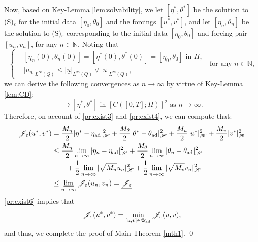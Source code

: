 \documentclass{sinst}
\numberwithin{equation}{section}
\theoremstyle{plain}
\theoremstyle{definition}
\def\N{\mathbb{N}}
\def\sH{\mathscr{H}}
\def\sJ{\mathscr{J}}
\def\sU{\mathscr{U}}
\def\ad{{\rm ad}}
\begin{document}
Now, based on Key-Lemma \ref{lem:solvability}, we let $[\eta^*, \theta^*]$ be the solution to (S)$_\varepsilon$ for the initial data $[\eta_0, \theta_0]$ and the forcings $[u^*, v^*]$, and let $[\eta_n, \theta_n]$ be the solution to (S)$_\varepsilon$ corresponding to the initial data $[\eta_0, \theta_0]$ and forcing pair $[u_n, v_n]$, for any $n \in \N$. Noting that
\begin{equation}
  \left\{ \begin{aligned}
    &[\eta_n(0), \theta_n(0)] = [\eta^*(0), \theta^*(0)] = [\eta_0, \theta_0] \mbox{ in } H,
    \\
    &|u_n|_{L^\infty(Q)} \leq |\underline{u}|_{L^\infty(Q)} \vee |\overline{u}|_{L^\infty(Q)},
  \end{aligned}
  \right. \ \mbox{ for any } n \in \N, 
\end{equation}
we can derive the following convergences as $n \to \infty$ by virtue of Key-Lemma \ref{lem:CD}:
\begin{equation}
  [\eta_n, \theta_n] \to [\eta^*, \theta^*] \mbox{ in } [C([0,T];H)]^2 \mbox{ as } n \to \infty. \label{pr:exist4}
\end{equation}
Therefore, on account of \eqref{pr:exist3} and \eqref{pr:exist4}, we can compute that:
\begin{align}
  \sJ_\varepsilon(u^*, v^*) &= \frac{M_\eta}{2}|\eta^* - \eta_\ad|_\sH^2 + \frac{M_\theta}{2} |\theta^* - \theta_\ad|_\sH^2 + \frac{M_u}{2} |u^*|_\sH^2 + \frac{M_v}{2} |v^*|_\sH^2 
  \\
  &\leq \frac{M_\eta}{2}\lim_{n \to \infty} |\eta_n - \eta_\ad|_\sH^2 + \frac{M_\theta}{2} \lim_{n \to \infty}|\theta_n - \theta_\ad|_\sH^2 \label{pr:exist6}
  \\
  &\qquad + \frac{1}{2} \varliminf_{n \to \infty} |\sqrt{M_u} u_n|_\sH^2 + \frac{1}{2} \varliminf_{n \to \infty} |\sqrt{M_v} v_n|_\sH^2
  \\
  &\leq \varliminf_{n \to \infty} \sJ_\varepsilon(u_n, v_n) = \underline{\sJ_\varepsilon}.
\end{align}
\eqref{pr:exist6} implies that 
\begin{equation}
  \sJ_\varepsilon(u^*, v^*) = \min_{[u,v] \in \sU_\ad} \sJ_\varepsilon(u,v),
\end{equation}
and thus, we complete the proof of Main Theorem \ref{mth1}. \qed
\end{document}
